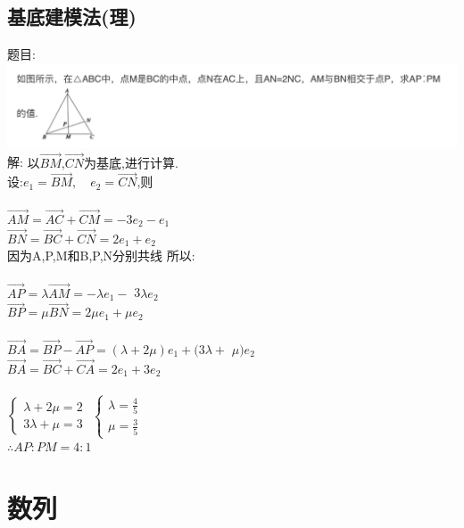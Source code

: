 \documentclass[hyperref, UTF8,11pt,a4paper]{ctexart} %
\begin{document}
\subsection{基底建模法(理)}
{\color{red}  题目: } \\
\includegraphics[width=500pt]  {pic/xiangliang/jidijianmofa.jpg} \\
解:{\color{blue} 以$\overrightarrow{B M}$,$\overrightarrow{C N}$为基底,进行计算.} \\
设:$e_{1}=\overrightarrow{B M}, \quad e_{2}=\overrightarrow{C N}$,则 \\ \\
$\overrightarrow{A M}=\overrightarrow{A C}+\overrightarrow{C M}=-3 e_{2}-e_{1}$ \\
$\overrightarrow{B N}=\overrightarrow{B C}+\overrightarrow{C N}=2 e_{1}+e_{2}$ \\
因为A,P,M和B,P,N分别共线 所以:\\ \\
$\overrightarrow{A P}=\lambda \overrightarrow{A M}=-\lambda e_{1}-$ 3$\lambda e_{2}$ \\
$\overrightarrow{B P}=\mu \overrightarrow{B N}=2 \mu e_{1}+\mu e_{2}$ \\ \\
$\overrightarrow{B A}=\overrightarrow{B P}-\overrightarrow{A P}=(\lambda+2 \mu) e_{1}+(3 \lambda+$ $\mu ) e_{2}$ \\
$\overrightarrow{B A}=\overrightarrow{B C}+\overrightarrow{C A}=2 e_{1}+3 e_{2}$ \\ \\
$\left\{\begin{array}{l}{\lambda+2 \mu=2} \\ {3 \lambda+\mu=3}\end{array}\right.$
$\left\{\begin{array}{l}{\lambda=\frac{4}{5}} \\ {\mu=\frac{3}{5}}\end{array}\right.$ \\
$\therefore A P : P M=4 : 1$


\newpage
\section{数列}
\end{document}
